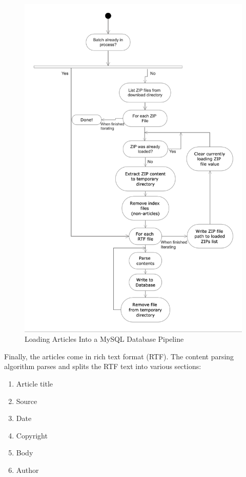 \begin{figure}[h!]
      \centering
      \includegraphics[scale=0.7]{method/Screenshot 2021-04-19 at 15.12.36.png}
      \caption{Loading Articles Into a MySQL Database Pipeline}
      \label{database loader}
\end{figure}

Finally, the articles come in rich text format (RTF). The content parsing algorithm parses and splits the RTF text into various sections:
\begin{enumerate}
    \item Article title
    \item Source
    \item Date
    \item Copyright
    \item Body
    \item Author
\end{enumerate}

